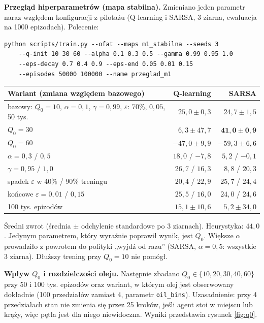 \documentclass[11pt,a4paper]{article}
\begin{document}
\textbf{Przegląd hiperparametrów (mapa stabilna).} Zmieniano jeden parametr naraz
względem konfiguracji z pilotażu (Q-learning i SARSA, 3 ziarna, ewaluacja na 1000
epizodach). Polecenie:
\begin{verbatim}
python scripts/train.py --ofat --maps m1_stabilna --seeds 3
    --q-init 10 30 60 --alpha 0.1 0.3 0.5 --gamma 0.99 0.95 1.0
    --eps-decay 0.7 0.4 0.9 --eps-end 0.05 0.01 0.15
    --episodes 50000 100000 --name przeglad_m1
\end{verbatim}
\begin{center}
\small
\begin{tabular}{@{}lrr@{}}
\toprule
Wariant (zmiana względem bazowego) & Q-learning & SARSA \\
\midrule
bazowy: $Q_0=10$, $\alpha=0{,}1$, $\gamma=0{,}99$, $\varepsilon$: 70\%, $0{,}05$, 50 tys. & $25{,}0 \pm 0{,}3$ & $24{,}7 \pm 1{,}5$ \\
$Q_0=30$ & $6{,}3 \pm 47{,}7$ & $\mathbf{41{,}0 \pm 0{,}9}$ \\
$Q_0=60$ & $-47{,}0 \pm 9{,}9$ & $-59{,}3 \pm 6{,}6$ \\
$\alpha=0{,}3$ / $0{,}5$ & $18{,}0$ / $-7{,}8$ & $5{,}2$ / $-0{,}1$ \\
$\gamma=0{,}95$ / $1{,}0$ & $26{,}7$ / $16{,}3$ & $8{,}8$ / $20{,}3$ \\
spadek $\varepsilon$ w 40\% / 90\% treningu & $20{,}4$ / $22{,}9$ & $25{,}7$ / $24{,}4$ \\
końcowe $\varepsilon=0{,}01$ / $0{,}15$ & $25{,}5$ / $16{,}0$ & $24{,}0$ / $24{,}6$ \\
100 tys. epizodów & $15{,}1 \pm 10{,}6$ & $5{,}2 \pm 34{,}0$ \\
\bottomrule
\end{tabular}
\end{center}
Średni zwrot (średnia $\pm$ odchylenie standardowe po 3 ziarnach). Heurystyka: $44{,}0$.
Jedynym parametrem, który wyraźnie poprawił wynik, jest $Q_0$. Większe $\alpha$
prowadziło z powrotem do polityki „wyjdź od razu” (SARSA, $\alpha=0{,}5$: wszystkie
3 ziarna). Dłuższy trening przy $Q_0=10$ nie pomógł.

\textbf{Wpływ $Q_0$ i rozdzielczości oleju.} Następnie zbadano $Q_0\in\{10,20,30,40,60\}$
przy 50 i 100 tys. epizodów oraz wariant, w którym olej jest obserwowany dokładnie
(100 przedziałów zamiast 4, parametr \texttt{oil\_bins}). Uzasadnienie: przy 4
przedziałach stan nie zmienia się przez 25 kroków, jeśli agent stoi w miejscu lub
krąży, więc pętla jest dla niego niewidoczna. Wyniki przedstawia rysunek
\ref{fig:q0}.
\end{document}

